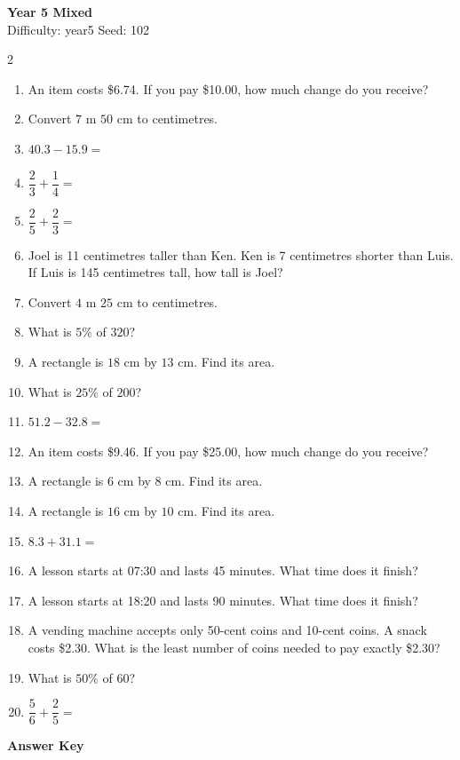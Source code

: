 \documentclass[11pt,a4paper]{article}
\begin{document}
\begin{center}
{\LARGE \textbf{Year 5 Mixed}}\\[0.5em]
Difficulty: year5 \quad Seed: 102
\end{center}

\begin{multicols}{2}
\begin{enumerate}
\item An item costs \$6.74. If you pay \$10.00, how much change do you receive?
\item Convert $7$ m $50$ cm to centimetres.
\item $40.3 - 15.9 =$
\item $\dfrac{2}{3} + \dfrac{1}{4} =$
\item $\dfrac{2}{5} + \dfrac{2}{3} =$
\item Joel is 11 centimetres taller than Ken. Ken is 7 centimetres shorter than Luis. If Luis is 145 centimetres tall, how tall is Joel?
\item Convert $4$ m $25$ cm to centimetres.
\item What is $5\%$ of $320$?
\item A rectangle is $18$ cm by $13$ cm. Find its area.
\item What is $25\%$ of $200$?
\item $51.2 - 32.8 =$
\item An item costs \$9.46. If you pay \$25.00, how much change do you receive?
\item A rectangle is $6$ cm by $8$ cm. Find its area.
\item A rectangle is $16$ cm by $10$ cm. Find its area.
\item $8.3 + 31.1 =$
\item A lesson starts at 07:30 and lasts 45 minutes. What time does it finish?
\item A lesson starts at 18:20 and lasts 90 minutes. What time does it finish?
\item A vending machine accepts only 50-cent coins and 10-cent coins. A snack costs \$2.30. What is the least number of coins needed to pay exactly \$2.30?
\item What is $50\%$ of $60$?
\item $\dfrac{5}{6} + \dfrac{2}{5} =$
\end{enumerate}
\end{multicols}

\newpage
\begin{center}
{\Large \textbf{Answer Key}}
\end{center}
\end{document}
